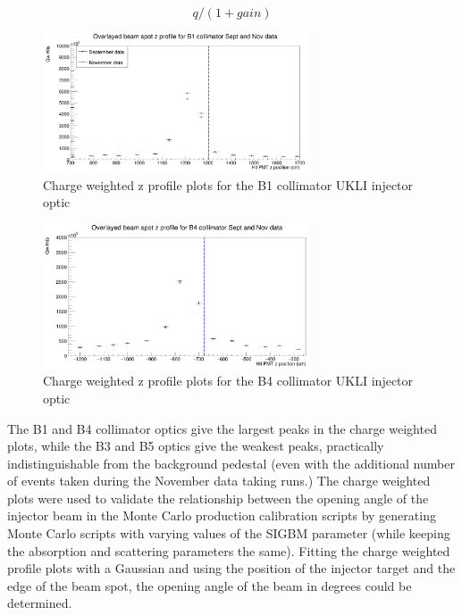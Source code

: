 \begin{equation}
    q/(1 + gain)
\label{eq:gain_correction}
\end{equation}

\begin{figure}
    \centering
    \includegraphics[width=0.7\textwidth]{Figures/charge_weighted_nov_sept_B1.PNG}
    \caption{Charge weighted z profile plots for the B1 collimator UKLI injector optic}
    \label{fig:charge_weighted_nov_sept_B1}
\end{figure}

\begin{figure}
    \centering
    \includegraphics[width=0.7\textwidth]{Figures/charge_weighted_nov_sept_B4.PNG}
    \caption{Charge weighted z profile plots for the B4 collimator UKLI injector optic}
    \label{fig:charge_weighted_nov_sept_B4}
\end{figure}

The B1 and B4 collimator optics give the largest peaks in the charge weighted plots, while the B3 and B5 optics give the weakest peaks, practically indistinguishable from the background pedestal (even with the additional number of events taken during the November data taking runs.) The charge weighted plots were used to validate the relationship between the opening angle of the injector beam in the Monte Carlo production calibration scripts by generating Monte Carlo scripts with varying values of the SIGBM parameter (while keeping the absorption and scattering parameters the same). Fitting the charge weighted profile plots with a Gaussian and using the position of the injector target and the edge of the beam spot, the opening angle of the beam in degrees could be determined.

